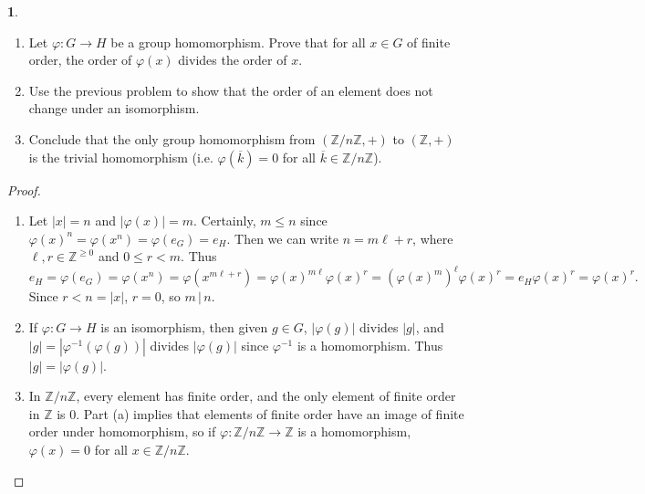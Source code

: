 \documentclass[12pt]{article}
\theoremstyle{definition}
\newtheorem{ex}{}
\begin{document}
\begin{ex}\
	\begin{enumerate}[label=(\alph*)]
		\item Let $\varphi: G \to H$ be a group homomorphism.
		      Prove that for all $x \in G$ of finite order, the order of $\varphi(x)$ divides the order of $x$.
		\item Use the previous problem to show that the order of an element does not change under an isomorphism.
		\item Conclude that the only group homomorphism from $(\mathbb{Z}/n \mathbb{Z}, +)$ to $(\mathbb{Z}, +)$ is the trivial homomorphism (i.e. $\varphi(\overline{k}) = 0$ for all $\overline{k} \in \mathbb{Z}/n \mathbb{Z}$).
	\end{enumerate}
\end{ex}
\begin{proof}\
	\begin{enumerate}[label=(\alph*)]
		\item Let $|x| = n$ and $|\varphi(x)| = m$.
		      Certainly, $m \leq n$ since $\varphi(x)^n = \varphi(x^n) = \varphi(e_G) = e_H$.
		      Then we can write $n = m\ell + r$, where $\ell, r \in \mathbb{Z}^{\geq 0}$ and $0 \leq r < m$.
		      Thus \begin{equation*}
			      e_H = \varphi(e_G) = \varphi(x^n) = \varphi(x^{m\ell + r}) = \varphi(x)^{m\ell}\varphi(x)^r = (\varphi(x)^{m})^\ell\varphi(x)^r = e_H\varphi(x)^r = \varphi(x)^r.
		      \end{equation*}
		      Since $r < n = |x|$, $r = 0$, so $m \,|\, n$.
		\item If $\varphi : G \to H$ is an isomorphism, then given $g \in G$, $|\varphi(g)|$ divides $|g|$, and $|g| = |\varphi^{-1}(\varphi(g))|$ divides $|\varphi(g)|$ since $\varphi^{-1}$ is a homomorphism.
		      Thus $|g| = |\varphi(g)|$.
		\item In $\mathbb{Z}/n \mathbb{Z}$, every element has finite order, and the only element of finite order in $\mathbb{Z}$ is 0.
		      Part (a) implies that elements of finite order have an image of finite order under homomorphism, so if $\varphi : \mathbb{Z}/n \mathbb{Z} \to \mathbb{Z}$ is a homomorphism, $\varphi(x) = 0$ for all $x \in \mathbb{Z}/n \mathbb{Z}$.
	\end{enumerate}
\end{proof}
\end{document}
